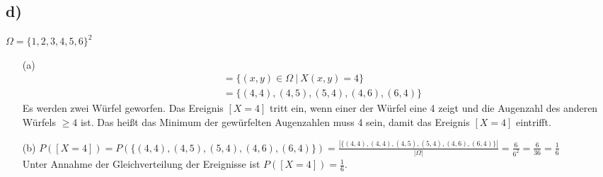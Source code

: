 \documentclass[enabledeprecatedfontcommands, a4paper]{scrartcl}
\begin{document}
\subsection*{d)}
$\Omega = \{1, 2, 3, 4,5 ,6\}^2$
\begin{itemize}
\item[(a)]
\begin{align*}
[X=4]&=\{(x,y) \in \Omega \ | \ X(x,y)=4\}\\
&=\{(4,4),(4,5),(5,4),(4,6),(6,4)\}
\end{align*}
Es werden zwei Würfel geworfen. Das Ereignis $[X=4]$ tritt ein, wenn einer der Würfel eine 4 zeigt und die Augenzahl des anderen Würfels $\ge 4$ ist. Das heißt das Minimum der gewürfelten Augenzahlen muss 4 sein, damit das Ereignis $[X=4]$ eintrifft.
\item[(b)]
$P([X=4])=P(\{(4,4),(4,5),(5,4),(4,6),(6,4)\})=\frac{|\{(4,4),(4,4),(4,5),(5,4),(4,6),(6,4)\}|}{|\Omega|}=\frac{6}{6^2}=\frac{6}{36}=\frac{1}{6}$\\
Unter Annahme der Gleichverteilung der Ereignisse ist $P([X=4])=\frac{1}{6}$.
\end{itemize}
\end{document}
